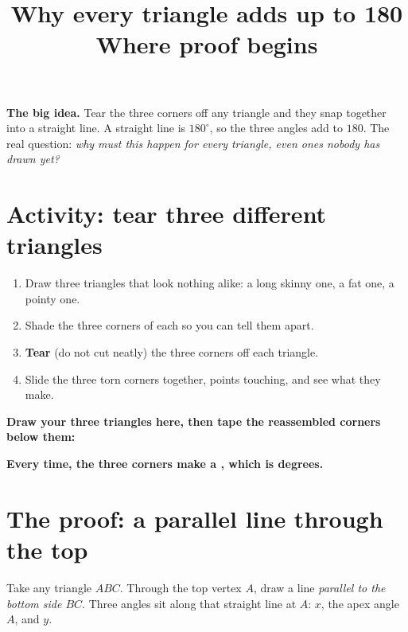 \documentclass[11pt]{article}
\title{\vspace{-1.5cm}\textbf{Why every triangle adds up to 180}\\[-2pt]
  \large Where proof begins}
\author{}
\date{}
\newcommand{\drawbox}[1]{%
  \par\vspace{4pt}\noindent
  \fbox{\rule{0pt}{#1}\rule{\dimexpr\linewidth-2\fboxsep-2\fboxrule}{0pt}}%
  \par\vspace{6pt}}
\newcommand{\task}[1]{\par\medskip\noindent\textbf{\color{benblue}#1}\par\nopagebreak}
\begin{document}
\maketitle
\vspace{-1.2cm}

\noindent\textbf{The big idea.} Tear the three corners off any triangle and they
snap together into a straight line. A straight line is $180^\circ$, so the three
angles add to $180$. The real question: \emph{why must this happen for every
triangle, even ones nobody has drawn yet?}

\section*{Activity: tear three different triangles}
\begin{enumerate}[leftmargin=*]
  \item Draw three triangles that look nothing alike: a long skinny one, a fat
        one, a pointy one.
  \item Shade the three corners of each so you can tell them apart.
  \item \textbf{Tear} (do not cut neatly) the three corners off each triangle.
  \item Slide the three torn corners together, points touching, and see what they
        make.
\end{enumerate}
\task{Draw your three triangles here, then tape the reassembled corners below them:}
\drawbox{4.5cm}

\task{Every time, the three corners make a \underline{\hspace{3cm}}, which is
\underline{\hspace{2cm}} degrees.}

\section*{The proof: a parallel line through the top}
Take any triangle $ABC$. Through the top vertex $A$, draw a line \emph{parallel to
the bottom side $BC$}. Three angles sit along that straight line at $A$:
$x$, the apex angle $A$, and $y$.

\begin{center}
\end{center}
\end{document}
